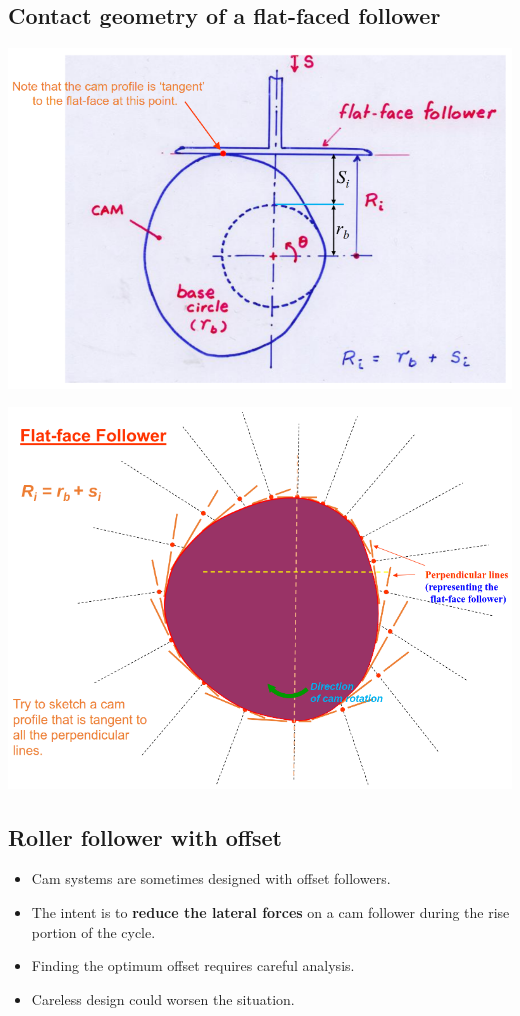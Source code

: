 \documentclass[11pt]{article}
\begin{document}
\subsection{Contact geometry of a flat-faced follower}
\label{sec:org53bb8a0}
\begin{center}
\includegraphics[width=.9\linewidth]{./images/contact-geometry-of-flat-faced-follower.png}
\end{center}

\begin{center}
\includegraphics[width=.9\linewidth]{./images/flat-faced-follower-and-cam-diagram.png}
\end{center}
\subsection{Roller follower with offset}
\label{sec:orgb88a292}
\begin{itemize}
\item Cam systems are sometimes designed with offset followers.
\item The intent is to \textbf{reduce the lateral forces} on a cam follower during the rise portion of the cycle.
\item Finding the optimum offset requires careful analysis.
\item Careless design could worsen the situation.
\end{itemize}
\end{document}
